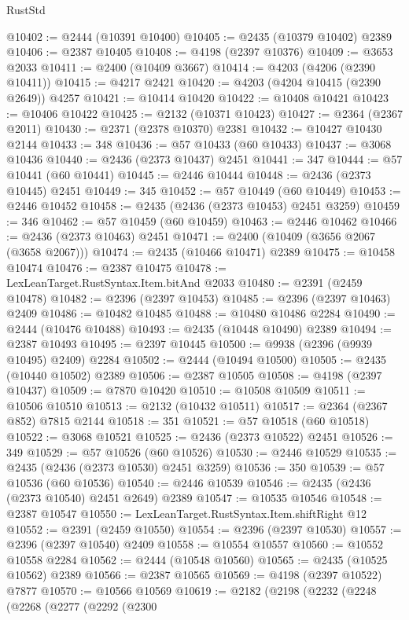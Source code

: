 \begin{lexlean}{RustStd}
\begin{coremodule}
@10402 := @2444 (@10391 @10400)
@10405 := @2435 (@10379 @10402) @2389
@10406 := @2387 @10405
@10408 := @4198 (@2397 @10376)
@10409 := @3653 @2033
@10411 := @2400 (@10409 @3667)
@10414 := @4203 (@4206 (@2390 @10411))
@10415 := @4217 @2421
@10420 := @4203 (@4204 @10415 (@2390 @2649)) @4257
@10421 := @10414 @10420
@10422 := @10408 @10421
@10423 := @10406 @10422
@10425 := @2132 (@10371 @10423)
@10427 := @2364 (@2367 @2011)
@10430 := @2371 (@2378 @10370) @2381
@10432 := @10427 @10430 @2144
@10433 := 348
@10436 := @57 @10433 (@60 @10433)
@10437 := @3068 @10436
@10440 := @2436 (@2373 @10437) @2451
@10441 := 347
@10444 := @57 @10441 (@60 @10441)
@10445 := @2446 @10444
@10448 := @2436 (@2373 @10445) @2451
@10449 := 345
@10452 := @57 @10449 (@60 @10449)
@10453 := @2446 @10452
@10458 := @2435 (@2436 (@2373 @10453) @2451 @3259)
@10459 := 346
@10462 := @57 @10459 (@60 @10459)
@10463 := @2446 @10462
@10466 := @2436 (@2373 @10463) @2451
@10471 := @2400 (@10409 (@3656 @2067 (@3658 @2067)))
@10474 := @2435 (@10466 @10471) @2389
@10475 := @10458 @10474
@10476 := @2387 @10475
@10478 := LexLeanTarget.RustSyntax.Item.bitAnd @2033
@10480 := @2391 (@2459 @10478)
@10482 := @2396 (@2397 @10453)
@10485 := @2396 (@2397 @10463) @2409
@10486 := @10482 @10485
@10488 := @10480 @10486 @2284
@10490 := @2444 (@10476 @10488)
@10493 := @2435 (@10448 @10490) @2389
@10494 := @2387 @10493
@10495 := @2397 @10445
@10500 := @9938 (@2396 (@9939 @10495) @2409) @2284
@10502 := @2444 (@10494 @10500)
@10505 := @2435 (@10440 @10502) @2389
@10506 := @2387 @10505
@10508 := @4198 (@2397 @10437)
@10509 := @7870 @10420
@10510 := @10508 @10509
@10511 := @10506 @10510
@10513 := @2132 (@10432 @10511)
@10517 := @2364 (@2367 @852) @7815 @2144
@10518 := 351
@10521 := @57 @10518 (@60 @10518)
@10522 := @3068 @10521
@10525 := @2436 (@2373 @10522) @2451
@10526 := 349
@10529 := @57 @10526 (@60 @10526)
@10530 := @2446 @10529
@10535 := @2435 (@2436 (@2373 @10530) @2451 @3259)
@10536 := 350
@10539 := @57 @10536 (@60 @10536)
@10540 := @2446 @10539
@10546 := @2435 (@2436 (@2373 @10540) @2451 @2649) @2389
@10547 := @10535 @10546
@10548 := @2387 @10547
@10550 := LexLeanTarget.RustSyntax.Item.shiftRight @12
@10552 := @2391 (@2459 @10550)
@10554 := @2396 (@2397 @10530)
@10557 := @2396 (@2397 @10540) @2409
@10558 := @10554 @10557
@10560 := @10552 @10558 @2284
@10562 := @2444 (@10548 @10560)
@10565 := @2435 (@10525 @10562) @2389
@10566 := @2387 @10565
@10569 := @4198 (@2397 @10522) @7877
@10570 := @10566 @10569
@10619 := @2182
    (@2198
      (@2232
        (@2248
          (@2268
            (@2277
              (@2292
                (@2300

\end{coremodule}
\end{lexlean}
